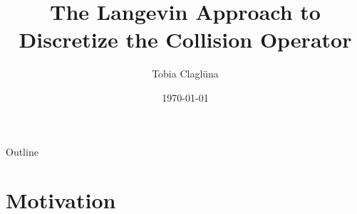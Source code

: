 





\title[\today]{The Langevin Approach to Discretize the Collision Operator}


\author{Tobia Claglüna}
\date{\today}
\def \myEmail {tobia.clagluena@psi.ch}





\begin{frame}{Outline}
    \setcounter{tocdepth}{1}
  \tableofcontents
\end{frame}

\section{Motivation}


